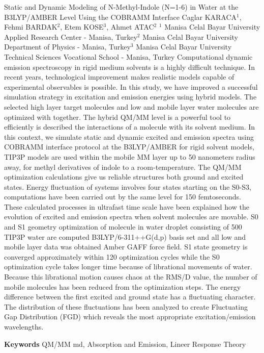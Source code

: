 
    \begin{abstract_online}{Static and Dynamic Modeling of N-Methyl-Indole \newline\noindent (N=1-6) in Water at the B3LYP/AMBER Level Using the COBRAMM Interface}{%
        Caglar KARACA$^{1}$, Fehmi BARDAK$^{2}$, Etem KOSE$^{3}$, Ahmet ATAC$^{2}$}{%
        }{%
        $^1$ Manisa Celal Bayar University Applied Research Center - Manisa, Turkey\newline{}$^2$ Manisa Celal Bayar University Department of Physics - Manisa, Turkey\newline{}$^3$ Manisa Celal Bayar University Technical Sciences Vocational School - Manisa, Turkey}
    Computational dynamic emission spectroscopy in rigid medium solvents is a highly difficult technique. In recent years, technological improvement makes realistic models capable of experimental observables is possible. In this study, we have improved a successful simulation strategy in excitation and emission energies using hybrid models. The selected high layer target molecules and low and mobile layer water molecules are optimized with together. The hybrid QM/MM level is a powerful tool to efficiently is described the interactions of a molecule with its solvent medium. In this context, we simulate static and dynamic excited and emission spectra using COBRAMM interface protocol at the B3LYP/AMBER for rigid solvent models, TIP3P models are used within the mobile MM layer up to 50 nanometers radius away, for methyl derivatives of indole to a room-temperature. The QM/MM optimization calculations give us reliable structures both ground and excited states. Energy fluctuation of systems involves four states starting on the S0-S3, computations have been carried out by the same level for 150 femtoseconds. These calculated processes in ultrafast time scale have been explained how the evolution of excited and emission spectra when solvent molecules are movable. S0 and S1 geometry optimization of molecule in water droplet consisting of 500 TIP3P water are computed B3LYP/6-311++G(d,p) basis set and all low and mobile layer data was obtained Amber GAFF force field. S1 state geometry is converged approximately within 120 optimization cycles while the S0 optimization cycle takes longer time because of librational movements of water. Because this librational motion causes chaos at the RMS/D value, the number of mobile molecules has been reduced from the optimization steps. The energy difference between the first excited and ground state has a fluctuating character. The distribution of these fluctuations has been analyzed to create Fluctuating Gap Distribution (FGD) which reveals the most appropriate excitation/emission wavelengths. 
    
        \textbf{Keywords} \newline{}QM/MM md, Absorption and Emission, Lineer Response Theory
    \end{abstract_online}
    